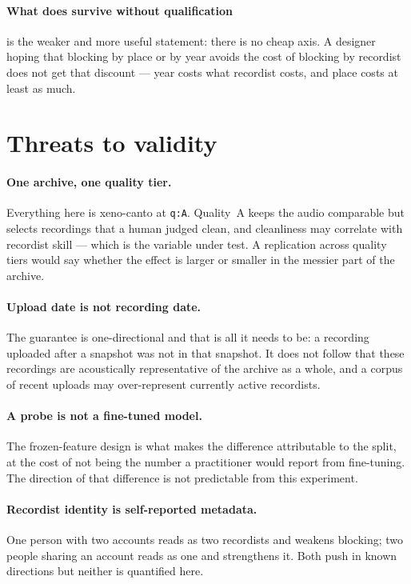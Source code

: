 \documentclass[10pt,twocolumn,a4paper]{article}
\begin{document}
\paragraph{What does survive without qualification} is the weaker and more useful statement:
there is no cheap axis. A designer hoping that blocking by place or by year avoids the cost of
blocking by recordist does not get that discount --- year costs what recordist costs, and place
costs at least as much.

\section{Threats to validity}
\label{sec:threats}

\paragraph{One archive, one quality tier.} Everything here is xeno-canto at \texttt{q:A}.
Quality~A keeps the audio comparable but selects recordings that a human judged clean, and
cleanliness may correlate with recordist skill --- which is the variable under test. A
replication across quality tiers would say whether the effect is larger or smaller in the
messier part of the archive.

\paragraph{Upload date is not recording date.} The guarantee is one-directional and that is
all it needs to be: a recording uploaded after a snapshot was not in that snapshot. It does
not follow that these recordings are acoustically representative of the archive as a whole,
and a corpus of recent uploads may over-represent currently active recordists.

\paragraph{A probe is not a fine-tuned model.} The frozen-feature design is what makes the
difference attributable to the split, at the cost of not being the number a practitioner
would report from fine-tuning. The direction of that difference is not predictable from this
experiment.

\paragraph{Recordist identity is self-reported metadata.} One person with two accounts reads
as two recordists and weakens blocking; two people sharing an account reads as one and
strengthens it. Both push in known directions but neither is quantified here.
\end{document}
